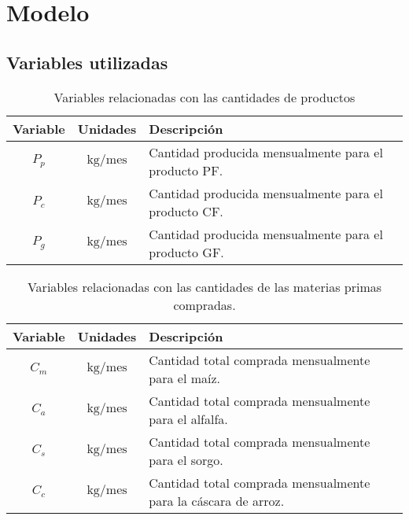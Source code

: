 \documentclass[a4paper,11pt]{article}
\begin{document}
\section{Modelo}

\subsection{Variables utilizadas}

\begin{table}[h!t]
  \centering
  \begin{tabular}{ | c | c | p{7cm} | }
    \hline
    \textbf{Variable} & \textbf{Unidades}          & \textbf{Descripción} \\ \hline
     \(P_p\)          & \(\text{kg} / \text{mes}\) & Cantidad producida mensualmente para el producto PF. \\ \hline
     \(P_c\)          & \(\text{kg} / \text{mes}\) & Cantidad producida mensualmente para el producto CF. \\ \hline
     \(P_g\)          & \(\text{kg} / \text{mes}\) & Cantidad producida mensualmente para el producto GF. \\ \hline
  \end{tabular}
  \caption{Variables relacionadas con las cantidades de productos}
\end{table}

\begin{table}[h!t]
  \centering
  \begin{tabular}{ | c | c | p{7cm} | }
    \hline
    \textbf{Variable} & \textbf{Unidades}          & \textbf{Descripción} \\ \hline
     \(C_m\)          & \(\text{kg} / \text{mes}\) & Cantidad total comprada mensualmente para el maíz. \\ \hline
     \(C_a\)          & \(\text{kg} / \text{mes}\) & Cantidad total comprada mensualmente para el alfalfa. \\ \hline
     \(C_s\)          & \(\text{kg} / \text{mes}\) & Cantidad total comprada mensualmente para el sorgo. \\ \hline
     \(C_c\)          & \(\text{kg} / \text{mes}\) & Cantidad total comprada mensualmente para la cáscara de arroz. \\ \hline
  \end{tabular}
  \caption{Variables relacionadas con las cantidades de las materias primas compradas.}
\end{table}
\end{document}

